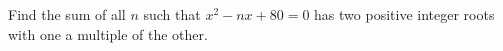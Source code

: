 Find the sum of all $n$ such that $x^2-nx+80=0$ has two positive integer roots with one a multiple of the other.
